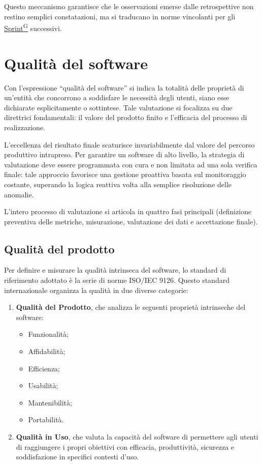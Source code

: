 \documentclass[a4paper,12pt]{article}
\providecommand{\glslink}[2]{\href{https://alittlebyte-19.github.io/Documentazione/glossario.html\#gls-#1}{\underline{#2}\textsuperscript{\scriptsize G}}}
\begin{document}
Questo meccanismo garantisce che le osservazioni emerse dalle retrospettive non restino semplici constatazioni, ma si traducano in norme vincolanti per gli \glslink{sprint}{Sprint} successivi.


\section{Qualità del software}
Con l'espressione ``qualità del software'' si indica la totalità delle proprietà di un'entità che concorrono a soddisfare le necessità degli utenti, siano esse dichiarate esplicitamente o sottintese. Tale valutazione si focalizza su due direttrici fondamentali: il valore del prodotto finito e l'efficacia del processo di realizzazione.

L'eccellenza del risultato finale scaturisce invariabilmente dal valore del percorso produttivo intrapreso. Per garantire un software di alto livello, la strategia di valutazione deve essere programmata con cura e non limitata ad una sola verifica finale: tale approccio favorisce una gestione proattiva basata sul monitoraggio costante, superando la logica reattiva volta alla semplice risoluzione delle anomalie.

L'intero processo di valutazione si articola in quattro fasi principali (definizione preventiva delle metriche, misurazione, valutazione dei dati e accettazione finale).

\subsection{Qualità del prodotto}
Per definire e misurare la qualità intrinseca del software, lo standard di riferimento adottato è la serie di norme ISO/IEC 9126. Questo standard internazionale organizza la qualità in due diverse categorie:
\begin{enumerate}
    \item \textbf{Qualità del Prodotto}, che analizza le seguenti proprietà intrinseche del software:
    \begin{itemize}
        \item Funzionalità;
        \item Affidabilità;
        \item Efficienza;
        \item Usabilità;
        \item Mantenibilità;
        \item Portabilità.
    \end{itemize}
    \item \textbf{Qualità in Uso}, che valuta la capacità del software di permettere agli utenti di raggiungere i propri obiettivi con efficacia, produttività, sicurezza e soddisfazione in specifici contesti d'uso.
\end{enumerate}
\end{document}
